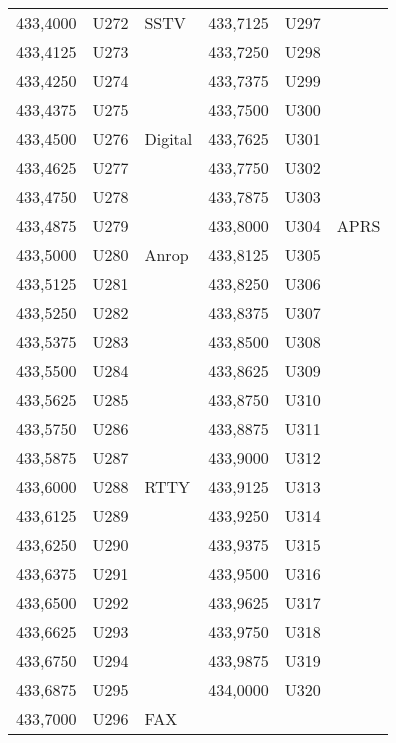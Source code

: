 \begin{longtable}{rrl|rrl}
433,4000 & U272 & SSTV    & 433,7125 & U297 &      \\
433,4125 & U273 &         & 433,7250 & U298 &      \\
433,4250 & U274 &         & 433,7375 & U299 &      \\
433,4375 & U275 &         & 433,7500 & U300 &      \\
433,4500 & U276 & Digital & 433,7625 & U301 &      \\
433,4625 & U277 &         & 433,7750 & U302 &      \\
433,4750 & U278 &         & 433,7875 & U303 &      \\
433,4875 & U279 &         & 433,8000 & U304 & APRS \\
433,5000 & U280 & Anrop   & 433,8125 & U305 &      \\
433,5125 & U281 &         & 433,8250 & U306 &      \\
433,5250 & U282 &         & 433,8375 & U307 &      \\
433,5375 & U283 &         & 433,8500 & U308 &      \\
433,5500 & U284 &         & 433,8625 & U309 &      \\
433,5625 & U285 &         & 433,8750 & U310 &      \\
433,5750 & U286 &         & 433,8875 & U311 &      \\
433,5875 & U287 &         & 433,9000 & U312 &      \\
433,6000 & U288 & RTTY    & 433,9125 & U313 &      \\
433,6125 & U289 &         & 433,9250 & U314 &      \\
433,6250 & U290 &         & 433,9375 & U315 &      \\
433,6375 & U291 &         & 433,9500 & U316 &      \\
433,6500 & U292 &         & 433,9625 & U317 &      \\
433,6625 & U293 &         & 433,9750 & U318 &      \\
433,6750 & U294 &         & 433,9875 & U319 &      \\
433,6875 & U295 &         & 434,0000 & U320 &      \\
433,7000 & U296 & FAX     &          &      &      \\

\end{longtable}

